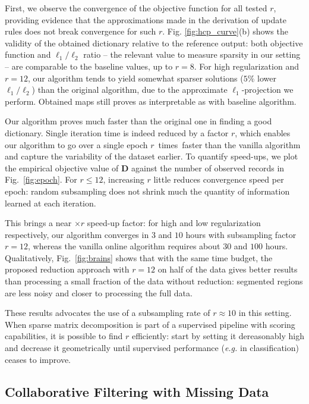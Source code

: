 \documentclass{article}
\def\D{{\mathbf D}}
\begin{document}
First, we observe the convergence of the objective
function for all tested $r$, providing evidence that the approximations made in the derivation of update rules does not break convergence for such $r$.
Fig. \ref{fig:hcp_curve}(b) shows the validity of the
obtained dictionary relative to the reference output: both objective function
and $\ell_1{/}\ell_2$ ratio -- the relevant value to measure sparsity in our setting -- are comparable to the baseline values, up to $r = 8$. For high regularization and $r = 12$, our algorithm
 tends to yield somewhat sparser solutions
 ($5\%$ lower $\ell_1{/}\ell_2$) than the original algorithm, due to the approximate $\ell_1$-projection we perform. Obtained maps still proves as interpretable as with baseline algorithm.

Our algorithm proves much faster than the original
one in finding a good dictionary. Single iteration time is indeed reduced by a
factor $r$, which enables our algorithm to go over a single epoch $r$~times~faster
than the vanilla algorithm and capture the variability of
the dataset earlier. To quantify speed-ups, we plot the empirical
objective value of $\D$ against the number of observed records in Fig.~\ref{fig:epoch}. For $r \leq 12$, increasing $r$ little reduces convergence
speed per epoch: random subsampling does not shrink much the quantity of information learned at each iteration.

This brings a near $\times r$ speed-up factor: for high and low regularization respectively, our algorithm converges in $3$ and $10$ hours with subsampling factor $r = 12$, whereas
the vanilla online algorithm requires about $30$ and $100$ hours.
Qualitatively, Fig.~\ref{fig:brains} shows that with the same time
budget, the proposed reduction approach with $r=12$ on half of the data
gives better results than processing a small fraction of the data without
reduction: segmented regions are less noisy and closer to processing the full data.

These results advocates the use of a subsampling rate of $r\approx10$ in this
setting. When sparse matrix decomposition is part of a supervised pipeline with
scoring capabilities, it is possible to find $r$ efficiently: start by setting
it dereasonably high and decrease it geometrically until supervised performance
(\textit{e.g.} in classification) ceases to improve.

\subsection{Collaborative Filtering with Missing Data}
\end{document}
